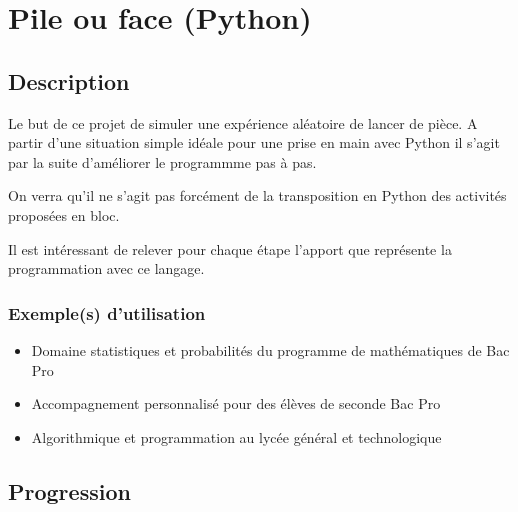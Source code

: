 \documentclass[letterpaper,10pt,french]{sphinxmanual}
\begin{document}
\noindent{}


\section{Pile ou face (Python)}
\label{\detokenize{decouverte/pileface-python:pile-ou-face-python}}\label{\detokenize{decouverte/pileface-python::doc}}\label{\detokenize{decouverte/pileface-python:pythonpileface}}

\subsection{Description}
\label{\detokenize{decouverte/pileface-python:description}}
Le but de ce projet de simuler une expérience aléatoire de lancer de pièce.
A partir d’une situation simple idéale pour une prise en main avec Python
il s’agit par la suite d’améliorer le programmme pas à pas.
\begin{quote}

{\hyperref[\detokenize{decouverte/pileface-bloc:blocpileface}]{}}
\end{quote}

On verra qu’il ne s’agit pas forcément de la transposition en Python des activités
proposées en bloc.

Il est intéressant de relever pour chaque étape l’apport que représente la programmation
avec  ce langage.


\subsubsection{Exemple(s) d’utilisation}
\label{\detokenize{decouverte/pileface-python:exemple-s-d-utilisation}}\begin{itemize}
\item {} 
Domaine statistiques et probabilités du programme de mathématiques de Bac Pro

\item {} 
Accompagnement personnalisé pour des élèves de seconde Bac Pro

\item {} 
Algorithmique et programmation au lycée général et technologique

\end{itemize}


\subsection{Progression}
\label{\detokenize{decouverte/pileface-python:progression}}
\end{document}
